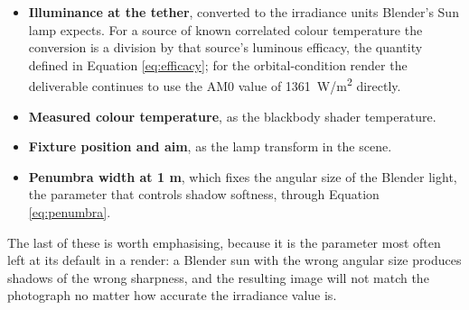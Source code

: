\begin{itemize}
    \item \textbf{Illuminance at the tether}, converted to the irradiance units Blender's Sun lamp expects. For a source of known correlated colour temperature the conversion is a division by that source's luminous efficacy, the quantity defined in Equation \ref{eq:efficacy}; for the orbital-condition render the deliverable continues to use the AM0 value of 1361~W/m\textsuperscript{2} directly.
    \item \textbf{Measured colour temperature}, as the blackbody shader temperature.
    \item \textbf{Fixture position and aim}, as the lamp transform in the scene.
    \item \textbf{Penumbra width at 1 m}, which fixes the angular size of the Blender light, the parameter that controls shadow softness, through Equation \ref{eq:penumbra}.
\end{itemize}

The last of these is worth emphasising, because it is the parameter most often left at its default in a render: a Blender sun with the wrong angular size produces shadows of the wrong sharpness, and the resulting image will not match the photograph no matter how accurate the irradiance value is.
